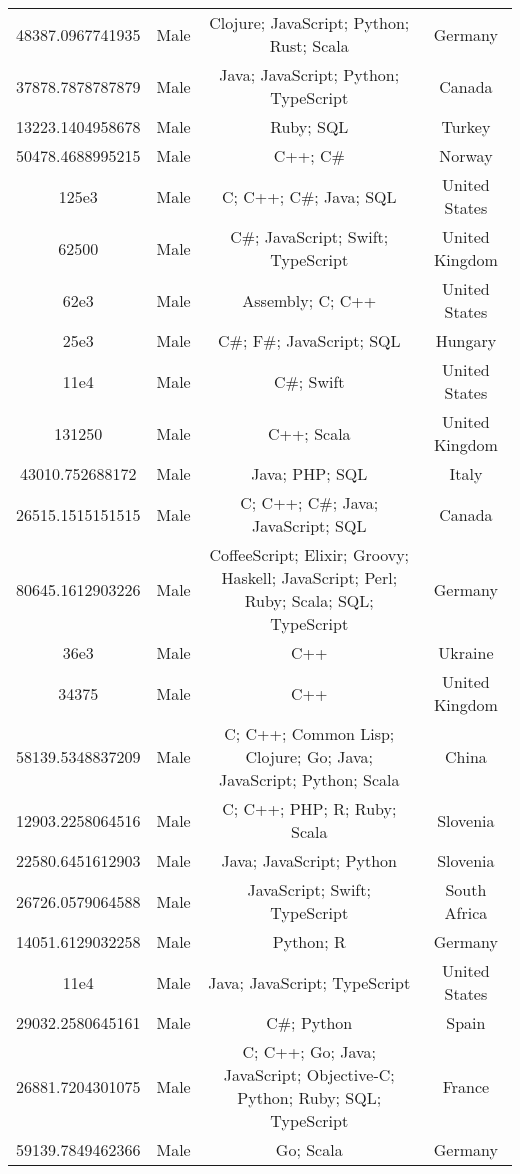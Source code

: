 \begin{center}
\begin{tabular}{ |c|c|c|c| }
48387.0967741935  &  Male  &  Clojure; JavaScript; Python; Rust; Scala  &  Germany  \\ 
37878.7878787879  &  Male  &  Java; JavaScript; Python; TypeScript  &  Canada  \\ 
13223.1404958678  &  Male  &  Ruby; SQL  &  Turkey  \\ 
50478.4688995215  &  Male  &  C++; C\#  &  Norway  \\ 
125e3  &  Male  &  C; C++; C\#; Java; SQL  &  United States  \\ 
62500  &  Male  &  C\#; JavaScript; Swift; TypeScript  &  United Kingdom  \\ 
62e3  &  Male  &  Assembly; C; C++  &  United States  \\ 
25e3  &  Male  &  C\#; F\#; JavaScript; SQL  &  Hungary  \\ 
11e4  &  Male  &  C\#; Swift  &  United States  \\ 
131250  &  Male  &  C++; Scala  &  United Kingdom  \\ 
43010.752688172  &  Male  &  Java; PHP; SQL  &  Italy  \\ 
26515.1515151515  &  Male  &  C; C++; C\#; Java; JavaScript; SQL  &  Canada  \\ 
80645.1612903226  &  Male  &  CoffeeScript; Elixir; Groovy; Haskell; JavaScript; Perl; Ruby; Scala; SQL; TypeScript  &  Germany  \\ 
36e3  &  Male  &  C++  &  Ukraine  \\ 
34375  &  Male  &  C++  &  United Kingdom  \\ 
58139.5348837209  &  Male  &  C; C++; Common Lisp; Clojure; Go; Java; JavaScript; Python; Scala  &  China  \\ 
12903.2258064516  &  Male  &  C; C++; PHP; R; Ruby; Scala  &  Slovenia  \\ 
22580.6451612903  &  Male  &  Java; JavaScript; Python  &  Slovenia  \\ 
26726.0579064588  &  Male  &  JavaScript; Swift; TypeScript  &  South Africa  \\ 
14051.6129032258  &  Male  &  Python; R  &  Germany  \\ 
11e4  &  Male  &  Java; JavaScript; TypeScript  &  United States  \\ 
29032.2580645161  &  Male  &  C\#; Python  &  Spain  \\ 
26881.7204301075  &  Male  &  C; C++; Go; Java; JavaScript; Objective-C; Python; Ruby; SQL; TypeScript  &  France  \\ 
59139.7849462366  &  Male  &  Go; Scala  &  Germany  \\ 

\end{tabular}
\end{center}

